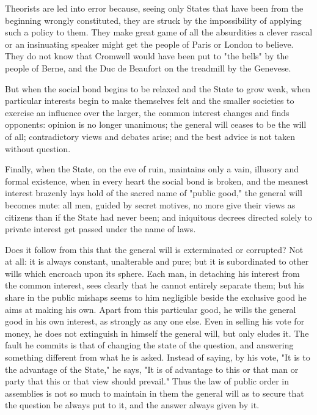 \documentclass[12pt]{report}
\begin{document}
Theorists are led into error because, seeing only States that have been from the beginning wrongly constituted, they are struck by the impossibility of applying such a policy to them. They make great game of all the absurdities a clever rascal or an insinuating speaker might get the people of Paris or London to believe. They do not know that Cromwell would have been put to "the bells" by the people of Berne, and the Duc de Beaufort on the treadmill by the Genevese.

But when the social bond begins to be relaxed and the State to grow weak, when particular interests begin to make themselves felt and the smaller societies to exercise an influence over the larger, the common interest changes and finds opponents: opinion is no longer unanimous; the general will ceases to be the will of all; contradictory views and debates arise; and the best advice is not taken without question.

Finally, when the State, on the eve of ruin, maintains only a vain, illusory and formal existence, when in every heart the social bond is broken, and the meanest interest brazenly lays hold of the sacred name of "public good," the general will becomes mute: all men, guided by secret motives, no more give their views as citizens than if the State had never been; and iniquitous decrees directed solely to private interest get passed under the name of laws.

Does it follow from this that the general will is exterminated or corrupted? Not at all: it is always constant, unalterable and pure; but it is subordinated to other wills which encroach upon its sphere. Each man, in detaching his interest from the common interest, sees clearly that he cannot entirely separate them; but his share in the public mishaps seems to him negligible beside the exclusive good he aims at making his own. Apart from this particular good, he wills the general good in his own interest, as strongly as any one else. Even in selling his vote for money, he does not extinguish in himself the general will, but only eludes it. The fault he commits is that of changing the state of the question, and answering something different from what he is asked. Instead of saying, by his vote, "It is to the advantage of the State," he says, "It is of advantage to this or that man or party that this or that view should prevail." Thus the law of public order in assemblies is not so much to maintain in them the general will as to secure that the question be always put to it, and the answer always given by it.
\end{document}
